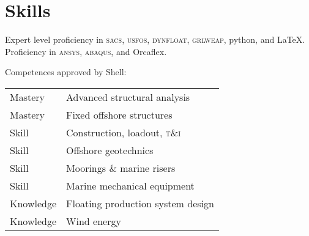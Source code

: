 \section*{Skills} %
\label{sec:comp}

Expert level proficiency in \textsc{sacs}, \textsc{usfos}, \textsc{dynfloat}, \textsc{grlweap}, python, and \LaTeX. Proficiency in \textsc{ansys}, \textsc{abaqus}, and Orcaflex. 

Competences approved by Shell:

\noindent\begin{tabular}{l l}
  Mastery & Advanced structural analysis \\
  Mastery & Fixed offshore structures \\
  Skill & Construction, loadout, \textsc{t\&i} \\
  Skill & Offshore geotechnics \\
  Skill & Moorings \& marine risers \\
  Skill & Marine mechanical equipment \\
  Knowledge & Floating production system design \\
  Knowledge & Wind energy \\
\end{tabular}

